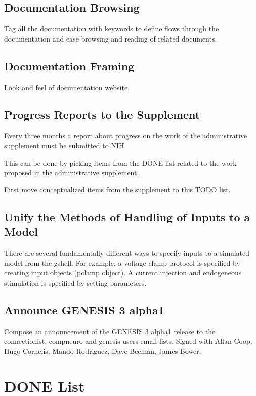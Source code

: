 \documentclass[12pt]{article}
\begin{document}
\subsection{Documentation Browsing}

Tag all the documentation with keywords to define flows through the
documentation and ease browsing and reading of related documents.


\subsection{Documentation Framing}

Look and feel of documentation website.


\subsection{Progress Reports to the Supplement}

Every three months a report about progress on the work of the
administrative supplement must be submitted to NIH.

This can be done by picking items from the DONE list related to the
work proposed in the administrative supplement.

First move conceptualized items from the supplement to this TODO list.


\subsection{Unify the Methods of Handling of Inputs to a Model}

There are several fundamentally different ways to specify inputs to a
simulated model from the gshell.  For example, a voltage clamp
protocol is specified by creating input objects (pclamp object).  A
current injection and endogeneous stimulation is specified by setting
parameters.


\subsection{Announce GENESIS 3 alpha1}

Compose an announcement of the GENESIS 3 alpha1 release to the
connectionist, compneuro and genesis-users email lists.  Signed with
Allan Coop, Hugo Cornelis, Mando Rodriguez, Dave Beeman, James Bower.


\section{DONE List}
\end{document}
